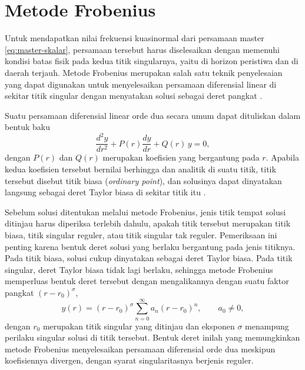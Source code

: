 \section{Metode Frobenius}
\label{sec:metode_frobenius}

\noindent Untuk mendapatkan nilai frekuensi kuasinormal dari persamaan master
\eqref{eq:master-skalar}, persamaan tersebut harus diselesaikan dengan memenuhi
kondisi batas fisik pada kedua titik singularnya, yaitu di horizon peristiwa dan
di daerah terjauh. Metode Frobenius merupakan salah satu teknik penyelesaian yang 
dapat digunakan untuk menyelesaikan
persamaan diferensial linear di sekitar titik singular dengan menyatakan
solusi sebagai deret pangkat \parencite{Leaver1985, Konoplya2011, Riley2006}.

Suatu persamaan diferensial linear orde dua secara umum dapat dituliskan dalam bentuk baku
\begin{equation}
    \frac{d^2y}{dr^2} + P(r)\frac{dy}{dr} + Q(r)\,y = 0,
    \label{eq:ode-baku}
\end{equation}
dengan $P(r)$ dan $Q(r)$ merupakan koefisien yang bergantung pada $r$. Apabila kedua
koefisien tersebut bernilai berhingga dan analitik di suatu titik, titik tersebut disebut
titik biasa (\textit{ordinary point}), dan solusinya dapat dinyatakan langsung sebagai
deret Taylor biasa di sekitar titik itu \parencite{Riley2006, boas2006}.

Sebelum solusi ditentukan melalui metode Frobenius, jenis titik tempat solusi ditinjau
harus diperiksa terlebih dahulu, apakah titik tersebut merupakan titik biasa, titik singular
reguler, atau titik singular tak reguler. Pemeriksaan ini penting karena bentuk deret solusi
yang berlaku bergantung pada jenis titiknya. Pada titik biasa, solusi cukup dinyatakan
sebagai deret Taylor biasa. Pada titik singular, deret Taylor biasa tidak lagi berlaku,
sehingga metode Frobenius memperluas bentuk deret tersebut dengan mengalikannya dengan suatu
faktor pangkat $(r - r_0)^{\sigma}$,
\begin{equation}
    y(r) = (r - r_0)^{\sigma} \sum_{n=0}^{\infty} a_n (r - r_0)^n , \qquad a_0 \neq 0,
    \label{eq:frobenius-umum}
\end{equation}
dengan $r_0$ merupakan titik singular yang ditinjau dan eksponen $\sigma$ menampung perilaku
singular solusi di titik tersebut. Bentuk deret inilah yang memungkinkan metode Frobenius
menyelesaikan persamaan diferensial orde dua meskipun koefisiennya divergen, dengan syarat 
singularitasnya berjenis reguler.

